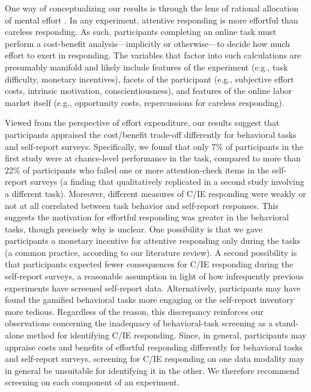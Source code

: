 \documentclass[a4paper,notitlepage,12pt]{article}
\begin{document}
One way of conceptualizing our results is through the lens of rational allocation of mental effort \cite{kool2018mental}. In any experiment, attentive responding is more effortful than careless responding. As such, participants completing an online task must perform a cost-benefit analysis---implicitly or otherwise---to decide how much effort to exert in responding. The variables that factor into such calculations are presumably manifold and likely include features of the experiment (e.g., task difficulty, monetary incentives), facets of the participant (e.g., subjective effort costs, intrinsic motivation, conscientiousness), and features of the online labor market itself (e.g., opportunity costs, repercussions for careless responding). 

Viewed from the perspective of effort expenditure, our results suggest that participants appraised the cost/benefit trade-off differently for behavioral tasks and self-report surveys. Specifically, we found that only 7\% of participants in the first study were at chance-level performance in the task, compared to more than 22\% of participants who failed one or more attention-check items in the self-report surveys (a finding that qualitatively replicated in a second study involving a different task). Moreover, different measures of C/IE responding were weakly or not at all correlated between task behavior and self-report responses. This suggests the motivation for effortful responding was greater in the behavioral tasks, though precisely why is unclear. One possibility is that we gave participants a monetary incentive for attentive responding only during the tasks (a common practice, according to our literature review). A second possibility is that participants expected fewer consequences for C/IE responding during the self-report surveys, a reasonable assumption in light of how infrequently previous experiments have screened self-report data. Alternatively, participants may have found the gamified behavioral tasks more engaging or the self-report inventory more tedious. Regardless of the reason, this discrepancy reinforces our observations concerning the inadequacy of behavioral-task screening as a stand-alone method for identifying C/IE responding. Since, in general, participants may appraise costs and benefits of effortful responding differently for behavioral tasks and self-report surveys, screening for C/IE responding on one data modality may in general be unsuitable for identifying it in the other. We therefore recommend screening on each component of an experiment.
\end{document}
